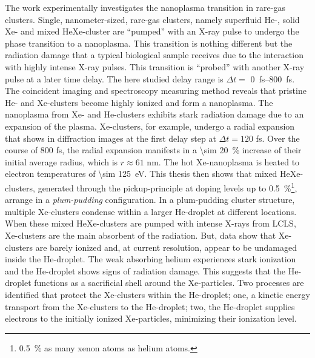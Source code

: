 The work experimentally investigates the nanoplasma transition in rare-gas clusters. Single, nanometer-sized, rare-gas clusters, namely superfluid He-, solid Xe- and mixed HeXe-cluster are ``pumped'' with an X-ray pulse to undergo the phase transition to a nanoplasma. This transition is nothing different but the radiation damage that a typical biological sample receives due to the interaction with highly intense X-ray pulses. This transition is ``probed'' with another X-ray pulse at a later time delay. The here studied delay range is $\Delta t=$ \SIrange{0}{800}{\femto\second}. The coincident imaging and spectroscopy measuring method reveals that pristine He- and Xe-clusters become highly ionized and form a nanoplasma. The nanoplasma from Xe- and He-clusters exhibits stark radiation damage due to an expansion of the plasma. Xe-clusters, for example, undergo a radial expansion that shows in diffraction images at the first delay step at $\Delta t = 120$ fs. Over the course of 800 fs, the radial expansion manifests in a \SI{\sim 20}{\percent} increase of their initial average radius, which is $r\approx 61$ nm. The hot Xe-nanoplasma is heated to electron temperatures of \SI{\sim 125}{\electronvolt}. This thesis then shows that mixed HeXe-clusters, generated through the pickup-principle at doping levels up to \SI{0.5}{\percent}\footnote{\SI{0.5}{\percent} as many xenon atoms as helium atoms.}, arrange in a \textit{plum-pudding} configuration. In a plum-pudding cluster structure, multiple Xe-clusters condense within a larger He-droplet at different locations. When these mixed HeXe-clusters are pumped with intense X-rays from LCLS, Xe-clusters are the main absorbent of the radiation. But, data show that Xe-clusters are barely ionized and, at current resolution, appear to be undamaged inside the He-droplet. The weak absorbing helium experiences stark ionization and the He-droplet shows signs of radiation damage. This suggests that the He-droplet functions as a sacrificial shell around the Xe-particles. Two processes are identified that protect the Xe-clusters within the He-droplet; one, a kinetic energy transport from the Xe-clusters to the He-droplet; two, the He-droplet supplies electrons to the initially ionized Xe-particles, minimizing their ionization level.\\[1\baselineskip]
%
